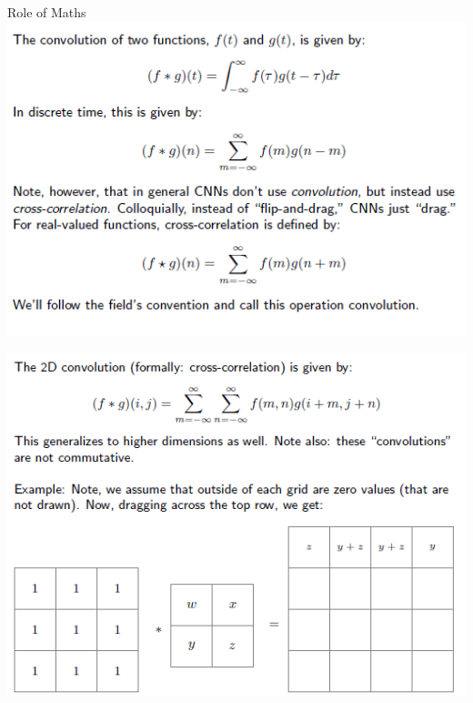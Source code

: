 \documentclass{beamer}
\begin{document}
\begin{frame}[t]{Role of Maths}
	\includegraphics[scale = 0.7]{cnn_math1.png}
\end{frame}

\begin{frame}
	\includegraphics[scale = 0.7]{cnn_math2.png}
\end{frame}
\end{document}
